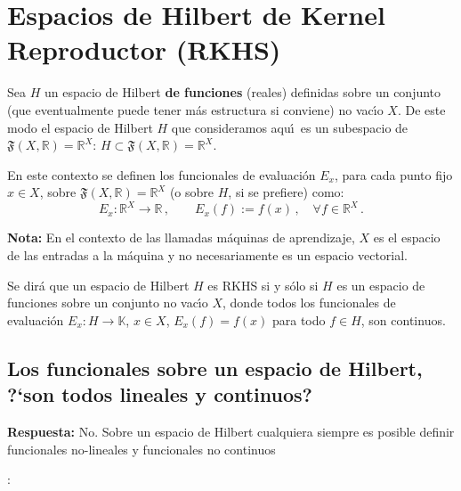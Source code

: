 \section{Espacios de Hilbert de Kernel Reproductor (RKHS)}



Sea $H$ un espacio de Hilbert {\bf de funciones} (reales) definidas sobre
un conjunto (que eventualmente puede tener m\'as estructura si conviene)
no vac\'\i o $X$.
De este modo el espacio de Hilbert $H$ que consideramos aqu\'\i\
es un subespacio de $\mathfrak{F}(X,\mathbb{R})=\mathbb{R}^X$:
$H\subset\mathfrak{F}(X,\mathbb{R})=\mathbb{R}^X$.

\begin{mydef}
En este contexto se definen los funcionales de evaluaci\'on $E_x$,
para cada punto fijo $x\in X$, sobre
$\mathfrak{F}(X,\mathbb{R})=\mathbb{R}^X$
(o sobre $H$, si se prefiere) como:
$$
E_x: \mathbb{R}^X\to\mathbb{R}\,,\qquad
E_x(f):=f(x)\,,\quad\forall f\in \mathbb{R}^X\,.
$$
\end{mydef}



\textbf{Nota:} En el contexto de las llamadas m\'aquinas de aprendizaje, $X$ es
el espacio de las entradas a la m\'aquina y no necesariamente es un espacio
vectorial.

\begin{mydef}
Se dir\'a que un espacio de Hilbert $H$ es RKHS si y s\'olo si
$H$ es un espacio de funciones sobre un conjunto no vac\'\i o $X$, donde
todos los funcionales de evaluaci\'on $E_x:H\to\mathbb{K}$, $x\in X$, 
$E_x(f)=f(x)$ para todo $f\in H$, son continuos.
\end{mydef}

\subsection*{Los funcionales sobre un espacio de Hilbert, ?`son todos lineales y continuos?}


\textbf{Respuesta:} No. Sobre un espacio de Hilbert cualquiera siempre es posible definir funcionales no-lineales y funcionales no continuos


:

